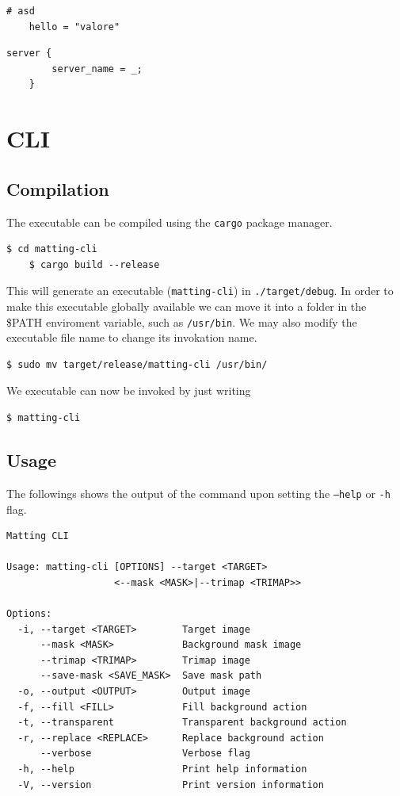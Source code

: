 \documentclass[a4paper]{article}
\begin{document}
\begin{lstlisting}[style=TOML, style=boxed]
    # asd
    hello = "valore"
\end{lstlisting}

\begin{lstlisting}[style=nginx, style=boxed]
    server {
        server_name = _;
    }
\end{lstlisting}

\pagebreak

\section{CLI}

\subsection{Compilation}

The executable can be compiled using the \texttt{cargo}
package manager.

\begin{lstlisting}[style=boxed]
    $ cd matting-cli
    $ cargo build --release
\end{lstlisting}

This will generate an executable (\texttt{matting-cli})
in \texttt{./target/debug}.
In order to make this executable globally available
we can move it into a folder in the \textsc{\$PATH} enviroment
variable, such as \texttt{/usr/bin}.
We may also modify the executable file name to change its invokation
name.

\begin{lstlisting}[style=boxed]
    $ sudo mv target/release/matting-cli /usr/bin/
\end{lstlisting}

We executable can now be invoked by just writing
\begin{lstlisting}[style=boxed]
    $ matting-cli
\end{lstlisting}

\subsection{Usage}

The followings shows the output of the command upon
setting the \texttt{--help} or \texttt{-h} flag.
\begin{lstlisting}[style=boxed]
Matting CLI

Usage: matting-cli [OPTIONS] --target <TARGET>
                   <--mask <MASK>|--trimap <TRIMAP>>

Options:
  -i, --target <TARGET>        Target image
      --mask <MASK>            Background mask image
      --trimap <TRIMAP>        Trimap image
      --save-mask <SAVE_MASK>  Save mask path
  -o, --output <OUTPUT>        Output image
  -f, --fill <FILL>            Fill background action
  -t, --transparent            Transparent background action
  -r, --replace <REPLACE>      Replace background action
      --verbose                Verbose flag
  -h, --help                   Print help information
  -V, --version                Print version information
\end{lstlisting}
\end{document}

